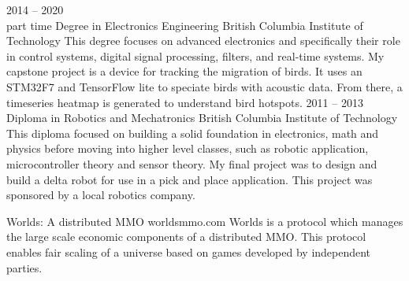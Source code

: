 \documentclass[9pt]{developercv} %
\begin{document}
\begin{entrylist}
	\entry
		{2014 -- 2020\\ \footnotesize{part time}}
		{Degree in Electronics Engineering}
		{British Columbia Institute of Technology}
		{
        This degree focuses on advanced electronics and specifically their role in control systems, digital signal processing, filters, and real-time systems. My capstone project is a device for tracking the migration of birds. It uses an STM32F7 and TensorFlow lite to speciate birds with acoustic data. From there, a timeseries heatmap is generated to understand bird hotspots.
        }
	\entry
		{2011 -- 2013}
		{Diploma in Robotics and Mechatronics}
		{British Columbia Institute of Technology}
		{
        This diploma focused on building a solid foundation in electronics, math and physics before moving into higher level classes, such as robotic application, microcontroller theory and sensor theory. My final project was to design and build a delta robot for use in a pick and place application. This project was sponsored by a local robotics company.
        }
\end{entrylist}



\begin{entrylist}
	\entry
		{}
		{Worlds: A distributed MMO}
		{worldsmmo.com}
		{
        Worlds is a protocol which manages the large scale economic components of a distributed MMO. This protocol enables fair scaling of a universe based on games developed by independent parties.
        }

\end{entrylist}
\end{document}
